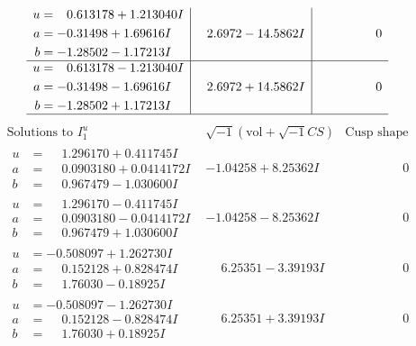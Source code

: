 \documentclass[1p]{elsarticle_modified}
\theoremstyle{definition}
\newcommand{\I}{\sqrt{-1}}
\begin{document}
$$\begin{array}{c|c|c}
\begin{aligned}
u &= \phantom{-}0.613178 + 1.213040 I \\
a &= -0.31498 + 1.69616 I \\
b &= -1.28502 - 1.17213 I\end{aligned}
 & \phantom{-}2.6972 - 14.5862 I & \phantom{-0.000000 } 0 \\ \hline\begin{aligned}
u &= \phantom{-}0.613178 - 1.213040 I \\
a &= -0.31498 - 1.69616 I \\
b &= -1.28502 + 1.17213 I\end{aligned}
 & \phantom{-}2.6972 + 14.5862 I & \phantom{-0.000000 } 0\\
 \hline 
 \end{array}$$\newpage$$\begin{array}{c|c|c}  
\text{Solutions to }I^u_{1}& \I (\text{vol} + \sqrt{-1}CS) & \text{Cusp shape}\\
 \hline 
\begin{aligned}
u &= \phantom{-}1.296170 + 0.411745 I \\
a &= \phantom{-}0.0903180 + 0.0414172 I \\
b &= \phantom{-}0.967479 - 1.030600 I\end{aligned}
 & -1.04258 + 8.25362 I & \phantom{-0.000000 } 0 \\ \hline\begin{aligned}
u &= \phantom{-}1.296170 - 0.411745 I \\
a &= \phantom{-}0.0903180 - 0.0414172 I \\
b &= \phantom{-}0.967479 + 1.030600 I\end{aligned}
 & -1.04258 - 8.25362 I & \phantom{-0.000000 } 0 \\ \hline\begin{aligned}
u &= -0.508097 + 1.262730 I \\
a &= \phantom{-}0.152128 + 0.828474 I \\
b &= \phantom{-}1.76030 - 0.18925 I\end{aligned}
 & \phantom{-}6.25351 - 3.39193 I & \phantom{-0.000000 } 0 \\ \hline\begin{aligned}
u &= -0.508097 - 1.262730 I \\
a &= \phantom{-}0.152128 - 0.828474 I \\
b &= \phantom{-}1.76030 + 0.18925 I\end{aligned}
 & \phantom{-}6.25351 + 3.39193 I & \phantom{-0.000000 } 0 \\ \hline\begin{aligned}

\end{aligned}
\end{array}$$
\end{document}
